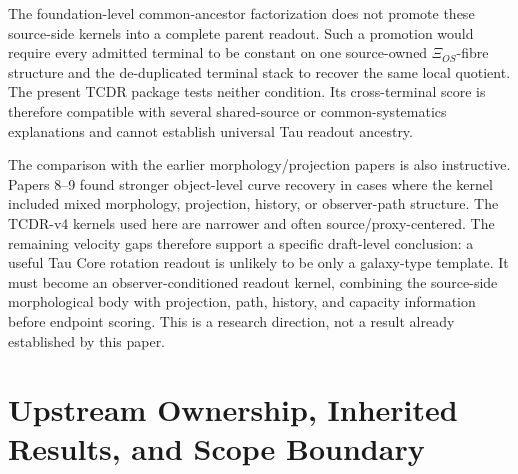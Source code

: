 \documentclass[11pt]{article}
\begin{document}
The foundation-level common-ancestor factorization does not promote these
source-side kernels into a complete parent readout.  Such a promotion would
require every admitted terminal to be constant on one source-owned
\(\Xi_{OS}\)-fibre structure and the de-duplicated terminal stack to recover
the same local quotient.  The present TCDR package tests neither condition.
Its cross-terminal score is therefore compatible with several shared-source
or common-systematics explanations and cannot establish universal Tau readout
ancestry.

The comparison with the earlier morphology/projection papers is also
instructive.  Papers 8--9 found stronger object-level curve recovery in cases
where the kernel included mixed morphology, projection, history, or
observer-path structure.  The TCDR-v4 kernels used here are narrower and often
source/proxy-centered.  The remaining velocity gaps therefore support a
specific draft-level conclusion: a useful Tau Core rotation readout is unlikely
to be only a galaxy-type template.  It must become an observer-conditioned
readout kernel, combining the source-side morphological body with projection,
path, history, and capacity information before endpoint scoring.  This is a
research direction, not a result already established by this paper.

\section{Upstream Ownership, Inherited Results, and Scope Boundary}
\label{sec:upstream-ownership-boundary}
\end{document}
